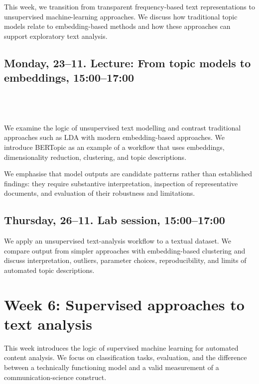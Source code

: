 This week, we transition from transparent frequency-based text representations to unsupervised machine-learning approaches. We discuss how traditional topic models relate to embedding-based methods and how these approaches can support exploratory text analysis.

\subsection*{Monday, 23--11. Lecture: From topic models to embeddings, 15:00--17:00}

\\
\\
\\

We examine the logic of unsupervised text modelling and contrast traditional approaches such as LDA with modern embedding-based approaches. We introduce BERTopic as an example of a workflow that uses embeddings, dimensionality reduction, clustering, and topic descriptions.

We emphasise that model outputs are candidate patterns rather than established findings: they require substantive interpretation, inspection of representative documents, and evaluation of their robustness and limitations.

\subsection*{Thursday, 26--11. Lab session, 15:00--17:00}

We apply an unsupervised text-analysis workflow to a textual dataset. We compare output from simpler approaches with embedding-based clustering and discuss interpretation, outliers, parameter choices, reproducibility, and limits of automated topic descriptions.


\section*{Week 6: Supervised approaches to text analysis}

This week introduces the logic of supervised machine learning for automated content analysis. We focus on classification tasks, evaluation, and the difference between a technically functioning model and a valid measurement of a communication-science construct.

